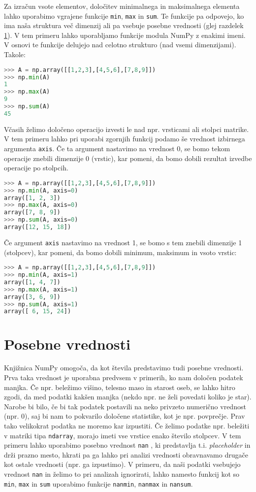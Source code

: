 Za izračun vsote elementov, določitev minimalnega in maksimalnega elementa lahko uporabimo vgrajene funkcije \texttt{min}, \texttt{max} in \texttt{sum}. Te funkcije pa odpovejo, ko ima naša struktura več dimenzij ali pa vsebuje posebne vrednosti (glej razdelek \ref{sec:np_nan}). V tem primeru lahko uporabljamo funkcije modula NumPy z enakimi imeni. V osnovi te funkcije delujejo nad celotno strukturo (nad vsemi dimenzijami). Takole:
\begin{lstlisting}[language=Python]
>>> A = np.array([[1,2,3],[4,5,6],[7,8,9]])
>>> np.min(A)
1
>>> np.max(A)
9
>>> np.sum(A)
45
\end{lstlisting}
Včasih želimo določeno operacijo izvesti le nad npr. vrsticami ali stolpci matrike. V tem primeru lahko pri uporabi zgornjih funkcij podamo še vrednost izbirnega argumenta \texttt{axis}. Če ta argument nastavimo na vrednost 0, se bomo tekom operacije znebili dimenzije 0 (vrstic), kar pomeni, da bomo dobili rezultat izvedbe operacije po stolpcih. %
\begin{lstlisting}[language=Python]
>>> A = np.array([[1,2,3],[4,5,6],[7,8,9]])
>>> np.min(A, axis=0)
array([1, 2, 3])
>>> np.max(A, axis=0)
array([7, 8, 9])
>>> np.sum(A, axis=0)
array([12, 15, 18])
\end{lstlisting}
Če argument \texttt{axis} nastavimo na vrednost 1, se bomo s tem znebili dimenzije 1 (stolpcev), kar pomeni, da bomo dobili minimum, maksimum in vsoto vrstic:%
\begin{lstlisting}[language=Python]
>>> A = np.array([[1,2,3],[4,5,6],[7,8,9]])
>>> np.min(A, axis=1)
array([1, 4, 7])
>>> np.max(A, axis=1)
array([3, 6, 9])
>>> np.sum(A, axis=1)
array([ 6, 15, 24])
\end{lstlisting}

\section{Posebne vrednosti}
\label{sec:np_nan}

Knjižnica NumPy omogoča, da kot števila predstavimo tudi posebne vrednosti. Prva taka vrednost je uporabna predvsem v primerih, ko nam določen podatek manjka. Če npr. beležimo višino, telesno maso in starost oseb, se lahko hitro zgodi, da med podatki kakšen manjka (nekdo npr. ne želi povedati koliko je star). Narobe bi bilo, če bi tak podatek postavili na neko privzeto numerično vrednost (npr. 0), saj bi nam to pokvarilo določene statistike, kot je npr. povprečje. Prav tako velikokrat podatka ne moremo kar izpustiti. Če želimo podatke npr. beležiti v matriki tipa \texttt{ndarray}, morajo imeti vse vrstice enako število stolpcev. V tem primeru lahko uporabimo posebno vrednost \texttt{nan} , ki predstavlja t.i. \emph{placeholder} in drži prazno mesto, hkrati pa ga lahko pri analizi vrednosti obravnavamo drugače kot ostale vrednosti (npr. ga izpustimo). V primeru, da naši podatki vsebujejo vrednost \texttt{nan} in želimo to pri analizah ignorirati, lahko namesto funkcij kot so \texttt{min}, \texttt{max} in \texttt{sum} uporabimo funkcije \texttt{nanmin}, \texttt{nanmax} in \texttt{nansum}.

